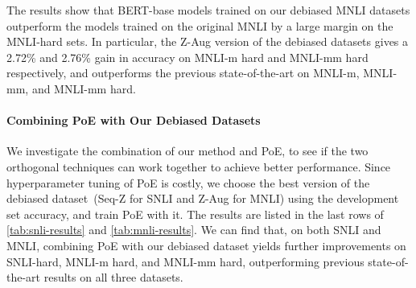 The results show that BERT-base models trained on our debiased MNLI datasets outperform the models trained on the original MNLI by a large margin on the MNLI-hard sets.
In particular, the Z-Aug version of the debiased datasets gives a 2.72\% and 2.76\% gain in accuracy on MNLI-m hard and MNLI-mm hard respectively, and outperforms the previous state-of-the-art on MNLI-m, MNLI-mm, and MNLI-mm hard.



\paragraph{Combining PoE with Our Debiased Datasets}

We investigate the combination of our method and PoE, to see if the two orthogonal techniques can work together to achieve better performance.
Since hyperparameter tuning of PoE is costly, we choose the best version of the debiased dataset~(Seq-Z for SNLI and Z-Aug for MNLI) using the development set accuracy, and train PoE with it.
The results are listed in the last rows of \cref{tab:snli-results} and \cref{tab:mnli-results}.
We can find that, on both SNLI and MNLI, combining PoE with our debiased dataset yields further improvements on SNLI-hard, MNLI-m hard, and MNLI-mm hard, outperforming previous state-of-the-art results on all three datasets.




